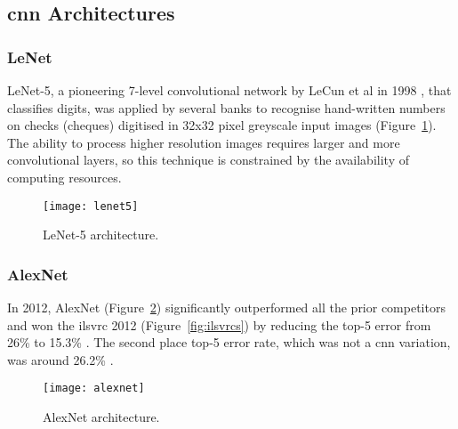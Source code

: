 \subsection{\acrshort{cnn} Architectures}
\subsubsection{LeNet}
LeNet-5, a pioneering 7-level convolutional network by LeCun et al in 1998
\cite{Lecun98gradient-basedlearning}, that classifies digits, was applied by
several banks to recognise hand-written numbers on checks (cheques) digitised
in 32x32 pixel greyscale input images (Figure~\ref{fig:lenet5}). The ability
to process higher resolution images requires larger and more convolutional
layers, so this technique is constrained by the availability of computing
resources.
\begin{figure}[h]
    \centering
    \texttt{[image: lenet5]}
    \caption{LeNet-5 architecture.}
    \label{fig:lenet5}
\end{figure}

\subsubsection{AlexNet}
In 2012, AlexNet \cite{Krizhevsky:2017:ICD:3098997.3065386}
(Figure~\ref{fig:alexnet}) significantly outperformed all the prior competitors
and won the \acrfull{ilsvrc} 2012 \cite{ILSVRC15} (Figure~\ref{fig:ilsvrcs}) by
reducing the top-5 error from 26\% to 15.3\% \cite{ILSVRC12}. The second place
top-5 error rate, which was not a \acrshort{cnn} variation, was around 26.2\%
\cite{ILSVRC12}.
\begin{figure}[h]
    \centering
    \texttt{[image: alexnet]}
    \caption{AlexNet architecture.}
    \label{fig:alexnet}
\end{figure}

